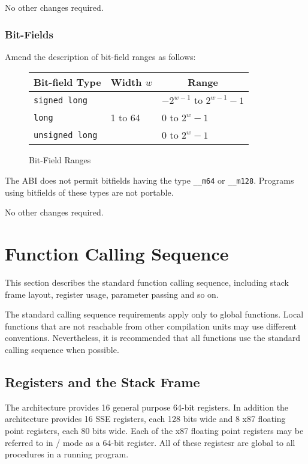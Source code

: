 No other changes required.

\subsubsection{Bit-Fields}

Amend the description of bit-field ranges as follows:

\begin{figure}[h]
\Hrule
  \caption{Bit-Field Ranges}
  \begin{center}
    \leavevmode
    \begin{tabular}{l|l|l}
      \multicolumn{1}{c}{Bit-field Type} 
         & \multicolumn{1}{c}{Width $w$} 
         & \multicolumn{1}{c}{Range} \\
      \hline
      \texttt{signed long} & & $-2^{w - 1}$ to $2^{w-1}-1$ \\
      \texttt{long} & 1 to 64 & 0 to $2^{w}-1$ \\
      \texttt{unsigned long} & & 0 to $2^{w}-1$ \\
    \end{tabular}
  \end{center}
\Hrule
\end{figure}

The ABI does not permit bitfields having the type \texttt{__m64} or
\texttt{__m128}.  Programs using bitfields of these types are not
portable.

No other changes required.

\section{Function Calling Sequence}

This section describes the standard function calling sequence,
including stack frame layout, register usage, parameter passing and so
on.

The standard calling sequence requirements apply only to global
functions.  Local functions that are not reachable from other
compilation units may use different conventions.  Nevertheless, it is
recommended that all functions use the standard calling sequence when
possible.

\subsection{Registers and the Stack Frame}
\label{subsec-registers}

The \xARCH architecture provides 16 general purpose 64-bit registers.
In addition the architecture provides 16 SSE registers, each 128 bits
wide and 8 x87 floating point registers, each 80 bits wide.  Each of
the x87 floating point registers may be referred to in \MMX/\threednow
mode as a 64-bit register.  All of these registesr are global to all
procedures in a running program.

